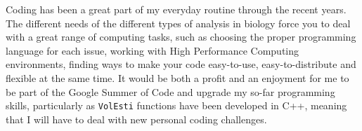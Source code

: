 \documentclass{article}
\begin{document}
Coding has been a great part of my everyday routine through the recent years. 
The different needs of the different types of analysis in biology force you to deal with a great range of computing tasks, such as choosing the proper programming language for each issue, working with High Performance Computing environments, finding ways to make your code easy-to-use, easy-to-distribute and flexible at the same time. 
It would be both a profit and an enjoyment for me to be part of the Google Summer of Code and upgrade my so-far programming skills, particularly as \texttt{VolEsti} functions have been developed in C++, meaning that I will have to deal with new personal coding challenges. 





\printbibliography
\end{document}
